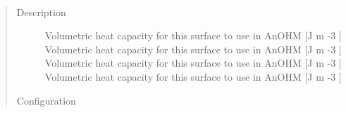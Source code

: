 \documentclass[letterpaper,10pt,english]{sphinxmanual}
\begin{document}
\begin{fulllineitems}
\begin{quote}
\begin{description}
\end{description}\end{quote}

\end{fulllineitems}


\begin{fulllineitems}
\label{\detokenize{input_files/SUEWS_SiteInfo/Input_Options:cmdoption-arg-anohm-cp}}~\begin{quote}\begin{description}
\item[{Description}] \leavevmode
Volumetric heat capacity for this surface to use in AnOHM {[}J m -3 {]} Volumetric heat capacity for this surface to use in AnOHM {[}J m -3 {]} Volumetric heat capacity for this surface to use in AnOHM {[}J m -3 {]} Volumetric heat capacity for this surface to use in AnOHM {[}J m -3 {]}

\item[{Configuration}] \leavevmode


\end{description}
\end{quote}
\end{fulllineitems}
\end{document}
